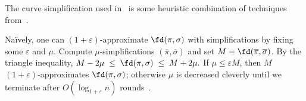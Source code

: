 \documentclass[english, thm-restate, notab]{lipics-v2021}
\begin{document}
\noindent
The curve simplification used in~\cite{harpeled_et_al:LIPIcs.SoCG.2025.54} is some heuristic combination of techniques from~\cite{AronovHKWW06, DriemelHW10}.
\noindent

Naïvely, one can $(1+\varepsilon)$-approximate $\fd(\pi, \sigma)$ with simplifications by fixing some $\varepsilon$ and $\mu$. Compute $\mu$-simplifications $(\overline{\pi},\overline{\sigma})$ and set $M=\fd(\overline{\pi},\overline{\sigma})$. 
By the triangle inequality, $
M-2\mu \;\leq\; \fd(\pi,\sigma) \;\leq\; M+2\mu.$
If $\mu\leq \varepsilon M$, then $M$ $(1+\varepsilon)$-approximates $\fd(\pi,\sigma)$; otherwise $\mu$ is decreased cleverly until we terminate   after $O(\log_{1+\varepsilon} n)$ rounds~\cite{DriemelHW10}.
\end{document}
